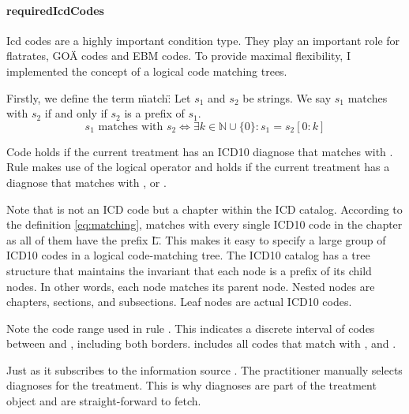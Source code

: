 \paragraph{requiredIcdCodes}
Icd codes are a highly important condition type.
They play an important role for flatrates, GOÄ codes and EBM codes.
To provide maximal flexibility, I implemented the concept of a logical code matching trees.



Firstly, we define the term \"match\":
Let \( s_1 \) and \( s_2 \) be strings.
We say \( s_1 \) matches with \( s_2 \) if and only if \( s_2 \) is a prefix of \( s_1 \).
\begin{equation}
    \label{eq:matching}
    s_1 \text{ matches with } s_2 \iff \exists k \in \mathbb{N} \cup \{0\} : s_1 = s_2[0:k]
\end{equation}

Code  holds if the current treatment has an ICD10 diagnose that matches with .
Rule  makes use of the logical  operator and holds if the current treatment has a diagnose that matches with ,  or .

Note that  is not an ICD code but a chapter within the ICD catalog.
According to the definition \ref{eq:matching},  matches with every single ICD10 code in the  chapter as all of them have the prefix \"L\".
This makes it easy to specify a large group of ICD10 codes in a logical code-matching tree.
The ICD10 catalog has a tree structure that maintains the invariant that each node is a prefix of its child nodes.
In other words, each node matches its parent node.
Nested nodes are chapters, sections, and subsections.
Leaf nodes are actual ICD10 codes.

Note the code range  used in rule .
This indicates a discrete interval of codes between  and , including both borders.
 includes all codes that match with ,  and .

Just as  it subscribes to the information source .
The practitioner manually selects diagnoses for the treatment.
This is why diagnoses are part of the treatment object and are straight-forward to fetch.

